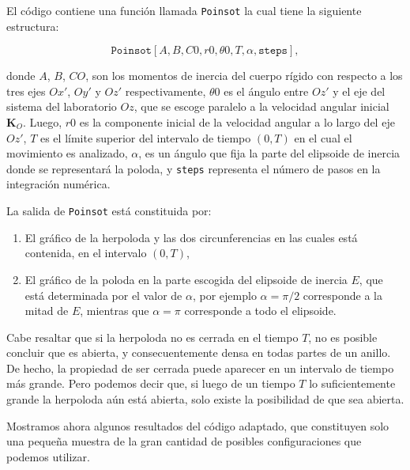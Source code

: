 \documentclass[a4paper,10pt]{article}
\numberwithin{equation}{section}
\begin{document}
\vspace{.3cm}

El código contiene una función llamada \texttt{Poinsot} la cual tiene la 
siguiente estructura:

$$
\texttt{Poinsot}[A,B,C0,r0 ,\theta 0,T,\alpha,\texttt{steps}],
$$

donde $A$, $B$, $CO$, son los momentos de inercia del cuerpo rígido con respecto 
a los tres ejes $Ox'$, $Oy'$ y $Oz'$ respectivamente, $\theta 0$ es el ángulo 
entre $Oz'$ y el eje del sistema del laboratorio $Oz$, que se escoge paralelo 
a la velocidad angular inicial $\mathbf{K}_O$. Luego, $r0$ es la componente 
inicial de la velocidad angular a lo largo del eje $Oz'$, $T$ es el límite 
superior del intervalo de tiempo $(0,T)$ en el cual el movimiento es 
analizado, $\alpha$, es un ángulo que fija la parte del elipsoide de 
inercia donde se representará la poloda, y \texttt{steps} representa 
el número de pasos en la integración numérica.

\vspace{.3cm}

La salida de \texttt{Poinsot} está constituida por:

\begin{enumerate}
 \item El gráfico de la herpoloda y las dos circunferencias en las cuales 
 está contenida, en el intervalo $(0,T)$,
 \item El gráfico de la poloda en la parte escogida del elipsoide de 
 inercia $E$, que está determinada por el valor de $\alpha$, por ejemplo 
 $\alpha = \pi/2$ corresponde a la mitad de $E$, mientras que $\alpha=\pi$
 corresponde a todo el elipsoide.
\end{enumerate}

Cabe resaltar que si la herpoloda no es cerrada en el tiempo $T$, no 
es posible concluir que es abierta, y consecuentemente densa en todas 
partes de un anillo. De hecho, la propiedad de ser cerrada puede aparecer 
en un intervalo de tiempo más grande. Pero podemos decir que, si luego 
de un tiempo $T$ lo suficientemente grande la herpoloda aún está abierta,
solo existe la posibilidad de que sea abierta.

\vspace{.3cm}

Mostramos ahora algunos resultados del código adaptado, que constituyen solo
una pequeña muestra de la gran cantidad de posibles configuraciones que 
podemos utilizar.

\vspace{.3cm}
\end{document}
